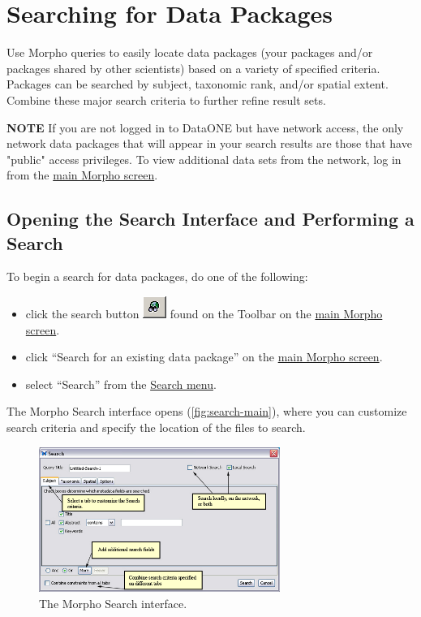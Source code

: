 \section{Searching for Data Packages} \label{sec:searching}

Use Morpho queries to easily locate data packages (your packages and/or
packages shared by other scientists) based on a variety of specified
criteria. Packages can be searched by subject, taxonomic rank, and/or
spatial extent. Combine these major search criteria to further refine
result sets. 

\begin{shaded}
  \textbf{NOTE} 
  If you are not logged in to DataONE but have network
  access, the only network data packages that will appear in your search
  results are those that have "public" access privileges. To view
  additional data sets from the network, log in 
  from the \hyperref[sec:main]{main Morpho screen}.
\end{shaded}

\subsection{Opening the Search Interface and Performing a Search}

To begin a search for data packages, do one of the following:
\begin{itemize}
  \setlength{\parskip}{1pt}
  \item click the search button
    \includegraphics[scale=0.7]{images/button-search.png} found on the
    Toolbar on the \hyperref[sec:main]{main Morpho screen}.
  \item click ``Search for an existing data package'' on the
    \hyperref[sec:main]{main Morpho screen}.
  \item select ``Search'' from the \hyperref[sec:menu-search]{Search
    menu}.
\end{itemize}

The Morpho Search interface opens (\autoref{fig:search-main}), where you
can customize search criteria and specify the location of the files to
search.

\begin{figure}
  \centering
    \includegraphics[width=0.7\textwidth]{images/search-main.jpg}
  \caption{The Morpho Search interface.}
  \label{fig:search-main}
\end{figure}

